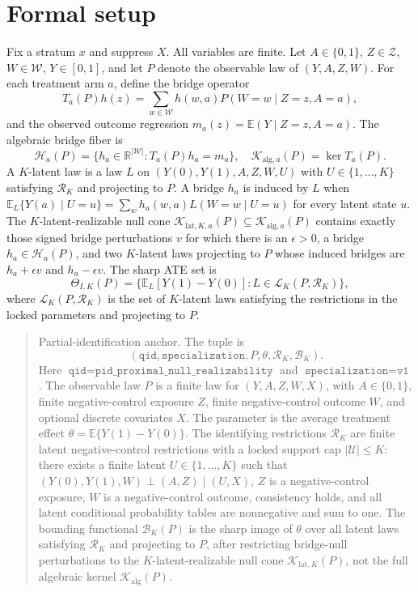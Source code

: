 \documentclass[11pt]{article}
\newcommand{\E}{\mathbb{E}}
\newcommand{\R}{\mathbb{R}}
\theoremstyle{definition}
\theoremstyle{plain}
\theoremstyle{remark}
\begin{document}
\section{Formal setup}
Fix a stratum \(x\) and suppress \(X\). All variables are finite. Let \(A\in\{0,1\}\), \(Z\in\mathcal Z\), \(W\in\mathcal W\), \(Y\in[0,1]\), and let \(P\) denote the observable law of \((Y,A,Z,W)\). For each treatment arm \(a\), define the bridge operator
\[
T_a(P)h(z)=\sum_{w\in\mathcal W} h(w,a)P(W=w\mid Z=z,A=a),
\]
and the observed outcome regression \(m_a(z)=\E(Y\mid Z=z,A=a)\). The algebraic bridge fiber is
\[
\mathcal H_a(P)=\{h_a\in\R^{|\mathcal W|}:T_a(P)h_a=m_a\},
\quad
\mathcal K_{\mathrm{alg},a}(P)=\ker T_a(P).
\]
A \(K\)-latent law is a law \(L\) on \((Y(0),Y(1),A,Z,W,U)\) with \(U\in\{1,\ldots,K\}\) satisfying \(\mathcal R_K\) and projecting to \(P\). A bridge \(h_a\) is induced by \(L\) when \(\E_L\{Y(a)\mid U=u\}=\sum_w h_a(w,a)L(W=w\mid U=u)\) for every latent state \(u\). The \(K\)-latent-realizable null cone \(\mathcal K_{\mathrm{lat},K,a}(P)\subseteq \mathcal K_{\mathrm{alg},a}(P)\) contains exactly those signed bridge perturbations \(v\) for which there is an \(\epsilon>0\), a bridge \(h_a\in\mathcal H_a(P)\), and two \(K\)-latent laws projecting to \(P\) whose induced bridges are \(h_a+\epsilon v\) and \(h_a-\epsilon v\). The sharp ATE set is
\[
\Theta_{I,K}(P)=\{\E_L[Y(1)-Y(0)]:L\in\mathcal L_K(P,\mathcal R_K)\},
\]
where \(\mathcal L_K(P,\mathcal R_K)\) is the set of \(K\)-latent laws satisfying the restrictions in the locked parameters and projecting to \(P\).

\begin{quote}
Partial-identification anchor. The tuple is
\[
(\texttt{qid},\texttt{specialization},P,\theta,\mathcal R_K,\mathcal B_K).
\]
Here \(\texttt{qid}=\texttt{pid\_proximal\_null\_realizability}\) and \(\texttt{specialization}=\texttt{v1}\). The observable law \(P\) is a finite law for \((Y,A,Z,W,X)\), with \(A\in\{0,1\}\), finite negative-control exposure \(Z\), finite negative-control outcome \(W\), and optional discrete covariates \(X\). The parameter is the average treatment effect \(\theta=\E\{Y(1)-Y(0)\}\). The identifying restrictions \(\mathcal R_K\) are finite latent negative-control restrictions with a locked support cap \(|\mathcal U|\le K\): there exists a finite latent \(U\in\{1,\ldots,K\}\) such that \((Y(0),Y(1),W)\perp(A,Z)\mid(U,X)\), \(Z\) is a negative-control exposure, \(W\) is a negative-control outcome, consistency holds, and all latent conditional probability tables are nonnegative and sum to one. The bounding functional \(\mathcal B_K(P)\) is the sharp image of \(\theta\) over all latent laws satisfying \(\mathcal R_K\) and projecting to \(P\), after restricting bridge-null perturbations to the \(K\)-latent-realizable null cone \(\mathcal K_{\mathrm{lat},K}(P)\), not the full algebraic kernel \(\mathcal K_{\mathrm{alg}}(P)\).
\end{quote}
\end{document}
